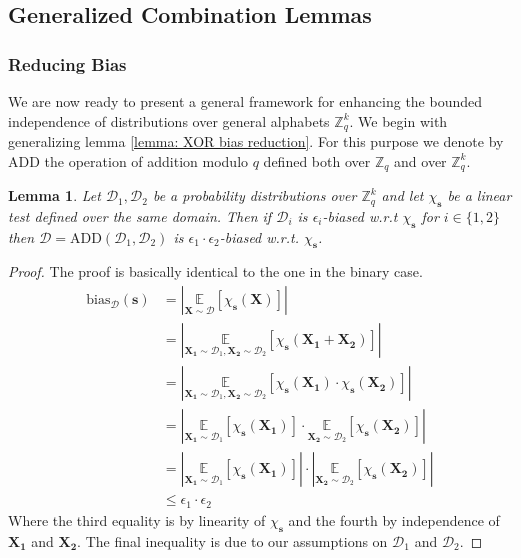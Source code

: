 \documentclass[12pt]{article}
\newtheorem{lemma}[theorem]{Lemma}
\newcommand{\bias}[2]{\mathrm{bias}_{#1}\left(#2\right)}
\newcommand{\dist}{\mathcal{D}}
\newcommand{\ADD}{\mathrm{ADD} }
\newcommand{\E}{\mathbb{E}}
\newcommand{\Z}{\mathbb{Z}}
\newcommand{\abs}[1]{\left| #1 \right|}
\renewcommand{\vec}[1]{\bm{#1}}
\begin{document}
	\subsection{Generalized Combination Lemmas}
	
	\subsubsection{Reducing Bias}
	
	We are now ready to present a general framework for enhancing the bounded independence of distributions over general alphabets $\Z_q^k$.
	We begin with generalizing lemma \ref{lemma: XOR bias reduction}.
	For this purpose we denote by ADD the operation of addition modulo $q$ defined both over $\Z_q$ and over $\Z_q^k$.
	
	\begin{lemma} \label{lemma: ADD bias reduction}
		Let $\dist_1, \dist_2$ be a probability distributions over $\Z_q^k$ and let $\chi_{\vec{s}}$ be a linear test defined over the same domain.
		Then if $\dist_i$ is $\epsilon_i$-biased w.r.t $\chi_{\vec{s}}$ for $i \in \{1,2\}$ then $\dist = \ADD(\dist_1, \dist_2)$ is $\epsilon_1 \cdot \epsilon_2$-biased w.r.t. $\chi_{\vec{s}}$.
	\end{lemma}
	
	\begin{proof}
		The proof is basically identical to the one in the binary case.
		\begin{align*}
			\bias{\dist}{\vec{s}}
			&= \abs{ \underset{\vec{X} \sim \dist}{\E} \left[ \chi_{\vec{s}}(\vec{X}) \right] } \\
			&= \abs{ \underset{\vec{X_1} \sim \dist_1, \vec{X_2} \sim \dist_2}{\E}
				\left[
					\chi_{\vec{s}}(\vec{X_1} + \vec{X_2})
				\right] } \\
			&= \abs{ \underset{\vec{X_1} \sim \dist_1, \vec{X_2} \sim \dist_2}{\E}
				\left[
					\chi_{\vec{s}}(\vec{X_1}) \cdot \chi_{\vec{s}}(\vec{X_2})
				\right] } \\
			&= \abs{
					\underset{\vec{X_1} \sim \dist_1}{\E} \left[ \chi_{\vec{s}}(\vec{X_1}) \right]
					\cdot \underset{\vec{X_2} \sim \dist_2}{\E} \left[ \chi_{\vec{s}}(\vec{X_2}) \right]
				} \\
			&= \abs{ \underset{\vec{X_1} \sim \dist_1}{\E}
					\left[ \chi_{\vec{s}}(\vec{X_1}) \right] }
				\cdot \abs{ \underset{\vec{X_2} \sim \dist_2}{\E}
					\left[ \chi_{\vec{s}}(\vec{X_2}) \right] } \\
			&\leq \epsilon_1 \cdot \epsilon_2
		\end{align*}
		Where the third equality is by linearity of $\chi_{\vec{s}}$ and the fourth by independence of $\vec{X_1}$ and $\vec{X_2}$.
		The final inequality is due to our assumptions on $\dist_1$ and $\dist_2$.
	\end{proof}
	
\end{document}
